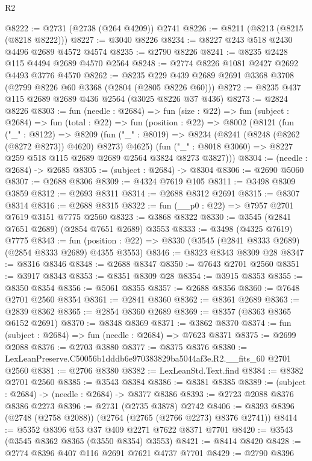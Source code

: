\begin{lexlean}{R2}
\begin{coremodule}
@8222 := @2731 (@2738 (@264 @4209)) @2741
@8226 := @8211 (@8213 (@8215 (@8218 @8222)))
@8227 := @3040 @8226
@8234 := @8227 @243 @518 @2430 @4496 @2689 @4572 @4574
@8235 := @2790 @8226
@8241 := @8235 @2428 @115 @4494 @2689 @4570 @2564
@8248 := @2774 @8226 @1081 @2427 @2692 @4493 @3776 @4570
@8262 := @8235 @229 @439 @2689 @2691 @3368 @3708 (@2799 @8226 @60 @3368 (@2804 (@2805 @8226 @60)))
@8272 := @8235 @437 @115 @2689 @2689 @436 @2564 (@3025 @8226 @37 @436)
@8273 := @2824 @8226
@8303 := fun (needle : @2684) =>
  fun (size : @22) =>
  fun (subject : @2684) =>
  fun (total : @22) =>
  fun (position : @22) =>
  @8002
    (@8121
      (fun ("_" : @8122) =>
      @8209
        (fun ("_" : @8019) => @8234 (@8241 (@8248 (@8262 (@8272 @8273)) @4620) @8273) @4625)
        (fun ("_" : @8018 @3060) => @8227 @259 @518 @115 @2689 @2689 @2564 @3824 @8273 @3827)))
@8304 := (needle : @2684) -> @2685
@8305 := (subject : @2684) -> @8304
@8306 := @2690 @5060
@8307 := @2688 @8306
@8309 := @4324 @7619 @105
@8311 := @3498 @8309 @3859
@8312 := @2693 @8311
@8314 := @2688 @8312 @2691
@8315 := @8307 @8314
@8316 := @2688 @8315
@8322 := fun (__p0 : @22) => @7957 @2701 @7619 @3151 @7775 @2560
@8323 := @3868 @8322
@8330 := @3545 (@2841 @7651 @2689) (@2854 @7651 @2689) @3553
@8333 := @3498 (@4325 @7619) @7775
@8343 := fun (position : @22) => @8330 (@3545 (@2841 @8333 @2689) (@2854 @8333 @2689) @4355 @3553)
@8346 := @8323 @8343 @8309 @28
@8347 := @8316 @8346
@8348 := @2688 @8347
@8350 := @7643 @2701 @2560
@8351 := @3917 @8343
@8353 := @8351 @8309 @28
@8354 := @3915 @8353
@8355 := @8350 @8354
@8356 := @5061 @8355
@8357 := @2688 @8356
@8360 := @7648 @2701 @2560 @8354
@8361 := @2841 @8360
@8362 := @8361 @2689
@8363 := @2839 @8362
@8365 := @2854 @8360 @2689
@8369 := @8357 (@8363 @8365 @6152 @2691)
@8370 := @8348 @8369
@8371 := @3862 @8370
@8374 := fun (subject : @2684) => fun (needle : @2684) => @7623 @8371
@8375 := @2699 @2088
@8376 := @2703 @3880
@8377 := @8375 @8376
@8380 := LexLeanPreserve.C50056b1dddb6e970383829ba5044af3e.R2.__fits_60 @2701 @2560
@8381 := @2706 @8380
@8382 := LexLeanStd.Text.find
@8384 := @8382 @2701 @2560
@8385 := @3543 @8384
@8386 := @8381 @8385
@8389 := (subject : @2684) -> (needle : @2684) -> @8377 @8386
@8393 := @2723 @2088 @8376 @8386 @2273
@8396 := @2731 (@2735 @3878) @2742
@8406 := @8393 @8396 (@2748 (@2758 @2088)) (@2764 (@2765 (@2766 @2273) @8376 @2741))
@8414 := @5352 @8396 @53 @37 @409 @2271 @7622 @8371 @7701
@8420 := @3543 (@3545 @8362 @8365 (@3550 @8354) @3553)
@8421 := @8414 @8420
@8428 := @2774 @8396 @407 @116 @2691 @7621 @4737 @7701
@8429 := @2790 @8396

\end{coremodule}
\end{lexlean}
